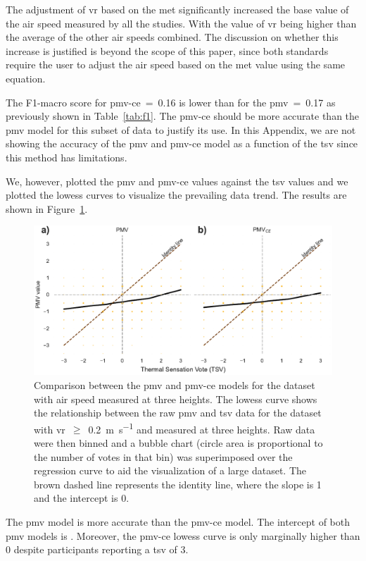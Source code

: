 The adjustment of \ac{vr} based on the \ac{met} significantly increased the base value of the air speed measured by all the studies.
With the value of \ac{vr} being  higher than the average of the other air speeds combined.
The discussion on whether this increase is justified is beyond the scope of this paper, since both standards require the user to adjust the air speed based on the \ac{met} value using the same equation.

The F1-macro score for \ac{pmv-ce}~=~\num{.16} is lower than for the \ac{pmv}~=~\num{.17} as previously shown in Table~\ref{tab:f1}.
The \ac{pmv-ce} should be more accurate than the \ac{pmv} model for this subset of data to justify its use.
In this Appendix, we are not showing the accuracy of the \ac{pmv} and \ac{pmv-ce} model as a function of the \ac{tsv} since this method has limitations.

We, however, plotted the \ac{pmv} and \ac{pmv-ce} values against the \ac{tsv} values and we plotted the \ac{lowess} curves to visualize the prevailing data trend.
The results are shown in Figure~\ref{fig:bubble_models_vs_tsv_three_heights}.
\begin{figure}[htb!]
    \centering
    \includegraphics[width=\textwidth]{figures/bubble_models_vs_tsv_three_heights}
    \caption{Comparison between the \ac{pmv} and \ac{pmv-ce} models for the dataset with air speed measured at three heights. 
    The \ac{lowess} curve shows the relationship between the raw \ac{pmv} and \ac{tsv} data for the dataset with \ac{vr}~$\geq$~\qty{0.2}{\m\per\s} and measured at three heights.
    Raw data were then binned and a bubble chart (circle area is proportional to the number of votes in that bin) was superimposed over the regression curve to aid the visualization of a large dataset.
    The brown dashed line represents the identity line, where the slope is 1 and the intercept is 0.}
    \label{fig:bubble_models_vs_tsv_three_heights}
\end{figure}
The \ac{pmv} model is more accurate than the \ac{pmv-ce} model.
The intercept of both \ac{pmv} models is .
Moreover, the \ac{pmv-ce} \ac{lowess} curve is only marginally higher than \num{0} despite participants reporting a \ac{tsv} of \num{3}.

